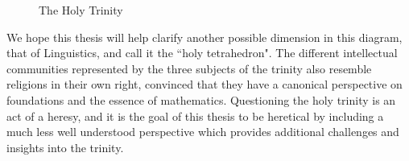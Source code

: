 \begin{figure}[H]
\centering
{}
\caption{The Holy Trinity} \label{fig:M1}
\end{figure}

We hope this thesis will help clarify another possible dimension in this
diagram, that of Linguistics, and call it the ``holy tetrahedron". The different
intellectual communities represented by the three subjects of the trinity also
resemble religions in their own right, convinced that they have a canonical
perspective on foundations and the essence of mathematics. Questioning the holy
trinity is an act of a heresy, and it is the goal of this thesis to be heretical
by including a much less well understood perspective which provides additional
challenges and insights into the trinity.

